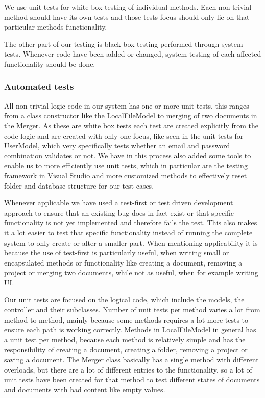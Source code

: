 We use unit tests for white box testing of individual methods. Each non-trivial method should have its own tests and those tests focus should only lie on that particular methods functionality.

The other part of our testing is black box testing performed through system tests. Whenever code have been added or changed, system testing of each affected functionality should be done.

\subsubsection{Automated tests}
All non-trivial logic code in our system has one or more unit tests, this ranges from a class constructor like the LocalFileModel to merging of two documents in the Merger. As these are white box tests each test are created explicitly from the code logic and are created with only one focus, like seen in the unit tests for UserModel, which very specifically tests whether an email and password combination validates or not. We have in this process also added some tools to enable us to more efficiently use unit tests, which in particular are the testing framework in Visual Studio and more customized methods to effectively reset folder and database structure for our test cases.

Whenever applicable we have used a test-first or test driven development approach to ensure that an existing bug does in fact exist or that specific functionality is not yet implemented and therefore fails the test. This also makes it a lot easier to test that specific functionality instead of running the complete system to only create or alter a smaller part. When mentioning applicability it is because the use of test-first is particularly useful, when writing small  or encapsulated methods or functionality like creating a document, removing a project or merging two documents, while not as useful, when for example writing UI.

Our unit tests are focused on the logical code, which include the models, the controller and their subclasses. Number of unit tests per method varies a lot from method to method, mainly because some methods requires a lot more tests to ensure each path is working correctly. Methods in LocalFileModel in general has a unit test per method, because each method is relatively simple and has the responsibility of creating a document, creating a folder, removing a project or saving a document. The Merger class basically has a single method with different overloads, but there are a lot of different entries to the functionality, so a lot of unit tests have been created for that method to test different states of documents and documents with bad content like empty values.

